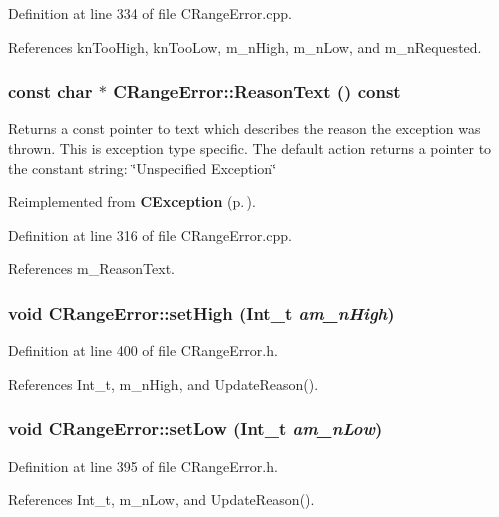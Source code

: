 Definition at line 334 of file CRange\-Error.cpp.

References kn\-Too\-High, kn\-Too\-Low, m\_\-n\-High, m\_\-n\-Low, and m\_\-n\-Requested.
\subsubsection{\setlength{\rightskip}{0pt plus 5cm}const char $\ast$ CRange\-Error::Reason\-Text () const\hspace{0.3cm}{\tt  [virtual]}}\label{classCRangeError_a9}


Returns a const pointer to text which describes the reason the exception was thrown. This is exception type specific. The default action returns a pointer to the constant string: \char`\"{}Unspecified Exception\char`\"{} 

Reimplemented from {\bf CException} {\rm (p.\,\pageref{classCException_a8})}.

Definition at line 316 of file CRange\-Error.cpp.

References m\_\-Reason\-Text.
\subsubsection{\setlength{\rightskip}{0pt plus 5cm}void CRange\-Error::set\-High ({\bf Int\_\-t} {\em am\_\-n\-High})\hspace{0.3cm}{\tt  [inline, protected]}}\label{classCRangeError_b1}




Definition at line 400 of file CRange\-Error.h.

References Int\_\-t, m\_\-n\-High, and Update\-Reason().
\subsubsection{\setlength{\rightskip}{0pt plus 5cm}void CRange\-Error::set\-Low ({\bf Int\_\-t} {\em am\_\-n\-Low})\hspace{0.3cm}{\tt  [inline, protected]}}\label{classCRangeError_b0}




Definition at line 395 of file CRange\-Error.h.

References Int\_\-t, m\_\-n\-Low, and Update\-Reason().
